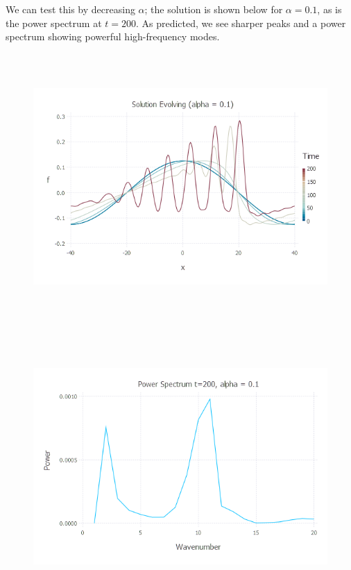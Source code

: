 \documentclass{article}
\begin{document}
We can test this by decreasing $\alpha$; the solution is shown below for $\alpha = 0.1$, as is the power spectrum at $t=200$. As predicted, we see sharper peaks and a power spectrum showing powerful high-frequency modes.
\begin{figure}[H]
	\includegraphics[width=6in,height=4in]{"q4_solution_a_01"}
\end{figure}
\begin{figure}[H]
	\includegraphics[width=6in,height=4in]{"q4_ps_200_a_01"}
\end{figure}
\end{document}
